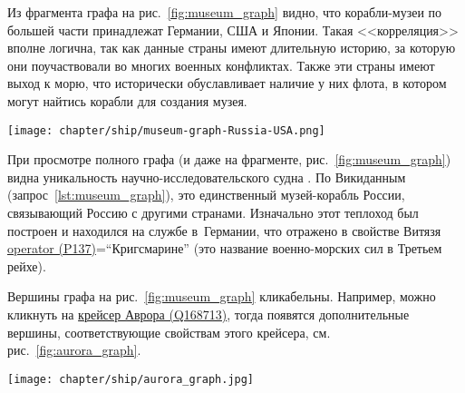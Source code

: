 Из фрагмента графа на рис.~\ref{fig:museum_graph} видно, 
что корабли-музеи по большей части принадлежат Германии, США и Японии. 
Такая <<корреляция>> вполне логична, так как данные страны имеют длительную историю, 
за которую они поучаствовали во многих военных конфликтах. 
Также эти страны имеют выход к морю, что исторически обуславливает наличие у них флота, 
в котором могут найтись корабли для создания музея.

\begin{figure*}[h!]
  \texttt{[image: chapter/ship/museum-graph-Russia-USA.png]}
  \caption[Граф стран и кораблей-музеев, 2021 год.]{Фрагмент графа стран, участвовавших в войнах, включает ряд кораблей-музеев России и США}%
  \label{fig:museum_graph}%
\end{figure*}

При просмотре полного графа (и даже на фрагменте, рис.~\ref{fig:museum_graph}) 
видна уникальность научно-исследовательского судна . 
По Викиданным (запрос~\ref{lst:museum_graph}), 
это единственный музей-корабль России, связывающий Россию с другими странами. 
Изначально этот теплоход был построен и находился на службе в~Германии, 
что отражено в свойстве Витязя 
\href{https://www.wikidata.org/wiki/Property:P137}{operator (P137)}=``Кригсма\-рине'' 
(это название военно-морских сил в Третьем рейхе).

Вершины графа на рис.~\ref{fig:museum_graph} кликабельны. 
Например, можно кликнуть на \href{https://www.wikidata.org/wiki/Q168713}{крейсер Аврора (Q168713)}, 
тогда появятся дополнительные вершины, соответствующие свойствам этого крейсера, см. рис.~\ref{fig:aurora_graph}.

\newpage
\begin{figure*}[h!]
  \texttt{[image: chapter/ship/aurora\_graph.jpg]}
  \caption[Граф свойств Авроры, 2021 год.]{Граф свойств \href{https://www.wikidata.org/wiki/Q168713}{крейсера Аврора (Q168713)} на 2021 год}%
  \label{fig:aurora_graph}%
\end{figure*}






